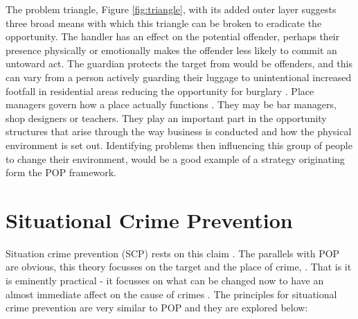 The problem triangle, Figure \ref{fig:triangle}, with its added outer layer suggests three broad means with which this triangle can be broken to eradicate the opportunity. The handler has an effect on the potential offender, perhaps their presence physically or emotionally makes the offender less likely to commit an untoward act.  The guardian protects the target from would be offenders, and this can vary from a person actively guarding their luggage to unintentional increased footfall in residential areas reducing the opportunity for burglary \parencite{halford2020crime}. Place managers govern how a place actually functions \parencite{popchap11}. They may be bar managers, shop designers or teachers. They play an important part in the opportunity structures that arise through the way business is conducted and how the physical environment is set out. Identifying problems then influencing this group of people to change their environment, would be a good example of a strategy originating form the POP framework.



\section{Situational Crime Prevention} Situation crime prevention (SCP) rests on this claim \parencite{scpchap13}. The parallels with POP are obvious, this theory focusses on the target and the place of crime,  \parencite{clarke1997situational}. That is it is eminently practical - it focusses on what can be changed now to have an almost immediate affect on the cause of crimes \parencite{clarke1995situational}. The principles for situational crime prevention are very similar to POP and they are explored below:

